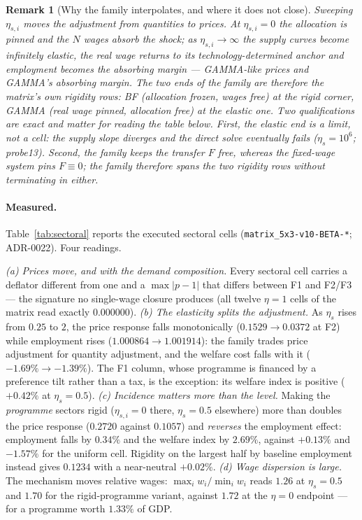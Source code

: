 \documentclass[11pt]{article}
\newtheorem{remark}{Remark}
\numberwithin{equation}{section}
\begin{document}
{\begin{remark}[Why the family interpolates, and where it does not close]
Sweeping $\eta_{s,i}$ moves the adjustment from quantities to prices. At
$\eta_{s,i} = 0$ the allocation is pinned and the $N$ wages absorb the shock;
as $\eta_{s,i} \to \infty$ the supply curves become infinitely elastic, the
real wage returns to its technology-determined anchor and employment becomes
the absorbing margin --- GAMMA-like prices and GAMMA's absorbing margin. The
two ends of the family are therefore the matrix's own rigidity rows: BF
(allocation frozen, wages free) at the rigid corner, GAMMA (real wage pinned,
allocation free) at the elastic one. Two qualifications are exact and matter
for reading the table below. First, the elastic end is a \emph{limit}, not a
cell: the supply slope diverges and the direct solve eventually fails
($\eta_s = 10^6$; probe13). Second, the family keeps the transfer $F$ free,
whereas the fixed-wage system pins $F \equiv 0$; the family therefore
\emph{spans} the two rigidity rows without terminating in either.
\end{remark}

\paragraph{Measured.} Table~\ref{tab:sectoral} reports the executed sectoral cells
(\textcolor{revisionV3}{\texttt{matrix\_5x3-v10-BETA-*}}; ADR-0022). Four readings.

\emph{(a) Prices move, and with the demand composition.} Every sectoral cell
carries a deflator different from one and a $\max|p-1|$ that differs between F1
and F2/F3 --- the signature no single-wage closure produces (all twelve
$\eta = 1$ cells of the matrix read exactly $0.000000$).
\emph{(b) The elasticity splits the adjustment.} As $\eta_s$ rises from $0.25$
to $2$, the price response falls monotonically ($0.1529 \to 0.0372$ at F2)
while employment rises ($1.000864 \to 1.001914$): the family trades price
adjustment for quantity adjustment, and the welfare cost falls with it
($-1.69\% \to -1.39\%$). The F1 column, whose programme is financed by a
preference tilt rather than a tax, is the exception: its welfare index is
positive ($+0.42\%$ at $\eta_s = 0.5$).
\emph{(c) Incidence matters more than the level.} Making the \emph{programme}
sectors rigid ($\eta_{s,i} = 0$ there, $\eta_s = 0.5$ elsewhere) more than
doubles the price response ($0.2720$ against $0.1057$) and \emph{reverses} the
employment effect: employment falls by $0.34\%$ and the welfare index by
$2.69\%$, against $+0.13\%$ and $-1.57\%$ for the uniform cell. Rigidity on the
largest half by baseline employment instead gives $0.1234$ with a near-neutral
$+0.02\%$.
\emph{(d) Wage dispersion is large.} The mechanism moves relative wages:
$\max_i w_i / \min_i w_i$ reads $1.26$ at $\eta_s = 0.5$ and $1.70$ for the
rigid-programme variant, against $1.72$ at the $\eta = 0$ endpoint --- for a
programme worth $1.33\%$ of GDP.

}
\end{document}
